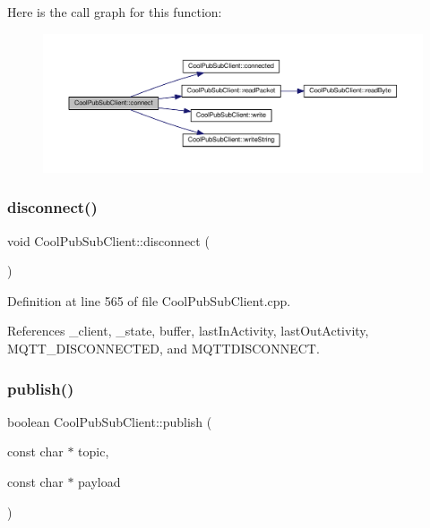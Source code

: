 Here is the call graph for this function\+:\nopagebreak
\begin{figure}[H]
\begin{center}
\leavevmode
\includegraphics[width=350pt]{d8/d4b/class_cool_pub_sub_client_a7e5a85731dd25d90a41f6d859e61da77_cgraph}
\end{center}
\end{figure}
\mbox{\label{class_cool_pub_sub_client_a60bd133e45bebc921f6df20f45106490}} 
\subsubsection{\texorpdfstring{disconnect()}{disconnect()}}
{\footnotesize\ttfamily void Cool\+Pub\+Sub\+Client\+::disconnect (\begin{DoxyParamCaption}{ }\end{DoxyParamCaption})}



Definition at line 565 of file Cool\+Pub\+Sub\+Client.\+cpp.



References \+\_\+client, \+\_\+state, buffer, last\+In\+Activity, last\+Out\+Activity, M\+Q\+T\+T\+\_\+\+D\+I\+S\+C\+O\+N\+N\+E\+C\+T\+ED, and M\+Q\+T\+T\+D\+I\+S\+C\+O\+N\+N\+E\+CT.

\mbox{\label{class_cool_pub_sub_client_ab6ad5fa2d3db8f91454027257f225a89}} 
\subsubsection{\texorpdfstring{publish()}{publish()}\hspace{0.1cm}{\footnotesize\ttfamily [1/4]}}
{\footnotesize\ttfamily boolean Cool\+Pub\+Sub\+Client\+::publish (\begin{DoxyParamCaption}\item[{const char $\ast$}]{topic,  }\item[{const char $\ast$}]{payload }\end{DoxyParamCaption})}



